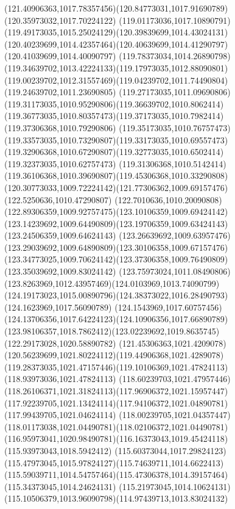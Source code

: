 {{		\curveto(121.40906363,1017.78357456)(120.84773031,1017.91690789)(120.35973032,1017.70224122)
		\curveto(119.01173036,1017.10890791)(119.49173035,1015.25024129)(120.39839699,1014.43024131)
		\curveto(120.40239699,1014.42357464)(120.40639699,1014.41290797)(120.41039699,1014.40090797)
		\curveto(119.78373034,1014.26890798)(119.34639702,1013.42224133)(119.17973035,1012.88090801)
		\curveto(119.00239702,1012.31557469)(119.04239702,1011.74490804)(119.24639702,1011.23690805)
		\curveto(119.27173035,1011.09690806)(119.31173035,1010.95290806)(119.36639702,1010.8062414)
		\curveto(119.36773035,1010.80357473)(119.37173035,1010.7982414)(119.37306368,1010.79290806)
		\curveto(119.35173035,1010.76757473)(119.33573035,1010.73290807)(119.33173035,1010.69557473)
		\curveto(119.32906368,1010.67290807)(119.32773035,1010.6502414)(119.32373035,1010.62757473)
		\curveto(119.31306368,1010.5142414)(119.36106368,1010.39690807)(119.45306368,1010.33290808)
		\curveto(120.30773033,1009.72224142)(121.77306362,1009.69157476)(122.5250636,1010.47290807)
		\curveto(122.7010636,1010.20090808)(122.89306359,1009.92757475)(123.10106359,1009.69424142)
		\curveto(123.14239692,1009.64490809)(123.19706359,1009.63424143)(123.24506359,1009.64624143)
		\curveto(123.26639692,1009.63957476)(123.29039692,1009.64890809)(123.30106358,1009.67157476)
		\curveto(123.34773025,1009.70624142)(123.37306358,1009.76490809)(123.35039692,1009.83024142)
		\curveto(123.75973024,1011.08490806)(123.8263969,1012.43957469)(124.0103969,1013.74090799)
		\curveto(124.19173023,1015.00890796)(124.38373022,1016.28490793)(124.1623969,1017.56090789)
		\curveto(124.1543969,1017.60757456)(124.13706356,1017.64224123)(124.10906356,1017.66890789)
		\curveto(123.98106357,1018.7862412)(123.02239692,1019.8635745)(122.29173028,1020.58890782)
		\curveto(121.45306363,1021.4209078)(120.56239699,1021.80224112)(119.44906368,1021.4289078)
		\curveto(119.28373035,1021.47157446)(119.10106369,1021.47824113)(118.93973036,1021.47824113)
		\curveto(118.60239703,1021.47957446)(118.26106371,1021.31824113)(117.96906372,1021.15957447)
		\curveto(117.92239705,1021.13424114)(117.94106372,1021.04890781)(117.99439705,1021.04624114)
		\curveto(118.00239705,1021.04357447)(118.01173038,1021.04490781)(118.02106372,1021.04490781)
		\curveto(116.95973041,1020.98490781)(116.16373043,1019.45424118)(115.93973043,1018.5942412)
		\curveto(115.60373044,1017.29824123)(115.47973045,1015.97824127)(115.74639711,1014.6622413)
		\curveto(115.59039711,1014.54757464)(115.47306378,1014.39157464)(115.34373045,1014.24624131)
		\curveto(115.21973045,1014.10624131)(115.10506379,1013.96090798)(114.97439713,1013.83024132)
}}
